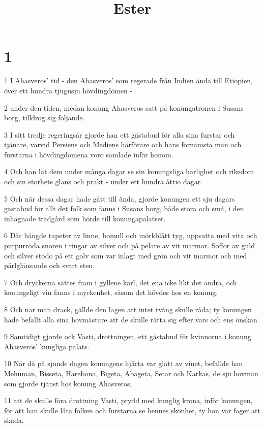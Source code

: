 

\title{Ester}


\chapter{1}

\par 1 I Ahasveros' tid - den Ahasveros' som regerade från Indien ända till Etiopien, över ett hundra tjugusju hövdingdömen -
\par 2 under den tiden, medan konung Ahasveros satt på konungatronen i Susans borg, tilldrog sig följande.
\par 3 I sitt tredje regeringsår gjorde han ett gästabud för alla sina furstar och tjänare, varvid Persiens och Mediens härförare och hans förnämsta män och furstarna i hövdingdömena voro samlade inför honom.
\par 4 Och han lät dem under många dagar se sin konungsliga härlighet och rikedom och sin storhets glans och prakt - under ett hundra åttio dagar.
\par 5 Och när dessa dagar hade gått till ända, gjorde konungen ett sju dagars gästabud för allt det folk som fanns i Susans borg, både stora och små, i den inhägnade trädgård som hörde till konungapalatset.
\par 6 Där hängde tapeter av linne, bomull och mörkblått tyg, uppsatta med vita och purpurröda snören i ringar av silver och på pelare av vit marmor. Soffor av guld och silver stodo på ett golv som var inlagt med grön och vit marmor och med pärlglänsande och svart sten.
\par 7 Och dryckerna sattes fram i gyllene kärl, det ena icke likt det andra, och konungsligt vin fanns i myckenhet, såsom det hövdes hos en konung.
\par 8 Och när man drack, gällde den lagen att intet tvång skulle råda; ty konungen hade befallt alla sina hovmästare att de skulle rätta sig efter vars och ens önskan.
\par 9 Samtidigt gjorde ock Vasti, drottningen, ett gästabud för kvinnorna i konung Ahasveros' kungliga palats.
\par 10 När då på sjunde dagen konungens hjärta var glatt av vinet, befallde han Mehuman, Bisseta, Harebona, Bigeta, Abageta, Setar och Karkas, de sju hovmän som gjorde tjänst hos konung Ahasveros,
\par 11 att de skulle föra drottning Vasti, prydd med kunglig krona, inför konungen, för att han skulle låta folken och furstarna se hennes skönhet, ty hon var fager att skåda.

